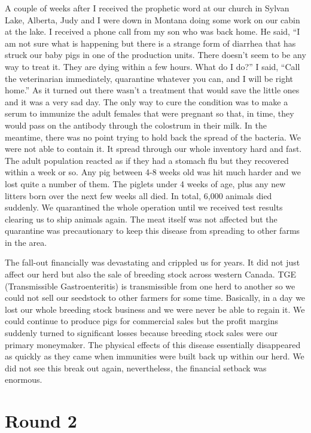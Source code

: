 \documentclass[oneside]{book}
\begin{document}
A couple of weeks after I received the prophetic word at our church in Sylvan Lake, Alberta, Judy and I were down in Montana doing some work on our cabin at the lake. I received a phone call from my son who was back home. He said, “I am not sure what is happening but there is a strange form of diarrhea that has struck our baby pigs in one of the production units. There doesn’t seem to be any way to treat it. They are dying within a few hours. What do I do?” I said, “Call the veterinarian immediately, quarantine whatever you can, and I will be right home.” As it turned out there wasn’t a treatment that would save the little ones and it was a very sad day. The only way to cure the condition was to make a serum to immunize the adult females that were pregnant so that, in time, they would pass on the antibody through the colostrum in their milk. In the meantime, there was no point trying to hold back the spread of the bacteria. We were not able to contain it. It spread through our whole inventory hard and fast. The adult population reacted as if they had a stomach flu but they recovered within a week or so. Any pig between 4-8 weeks old was hit much harder and we lost quite a number of them. The piglets under 4 weeks of age, plus any new litters born over the next few weeks all died. In total, 6,000 animals died suddenly. We quarantined the whole operation until we received test results clearing us to ship animals again. The meat itself was not affected but the quarantine was precautionary to keep this disease from spreading to other farms in the area.

The fall-out financially was devastating and crippled us for years. It did not just affect our herd but also the sale of breeding stock across western Canada. TGE (Transmissible Gastroenteritis) is transmissible from one herd to another so we could not sell our seedstock to other farmers for some time. Basically, in a day we lost our whole breeding stock business and we were never be able to regain it. We could continue to produce pigs for commercial sales but the profit margins suddenly turned to significant losses because breeding stock sales were our primary moneymaker. The physical effects of this disease essentially disappeared as quickly as they came when immunities were built back up within our herd. We did not see this break out again, nevertheless, the financial setback was enormous. 


\section{Round 2}
\
\end{document}
